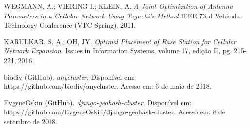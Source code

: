 \documentclass[]{politex}
\begin{document}
\begin{thebibliography}{9}
    WEGMANN, A.; VIERING I.; KLEIN, A.
    \textit{A Joint Optimization of Antenna Parameters in a
    Cellular Network Using Taguchi’s Method}
    IEEE 73rd Vehicular Technology Conference (VTC Spring), 2011.

    KARULKAR, S. A.; OH, JY.
    \textit{Optimal Placement of Base Station for Cellular Network Expansion}.
    Issues in Information Systems, volume 17, edição II, pg. 215-221, 2016.

    biodiv (GitHub).
    \textit{anycluster}.
    Disponível em: https://github.com/biodiv/anycluster.
    Acesso em: 6 de maio de 2018.

    EvgeneOskin (GitHub).
    \textit{django-geohash-cluster}.
    Disponível em: https://github.com/EvgeneOskin/django-geohash-cluster.
    Acesso em: 8 de setembro de 2018.

\end{thebibliography}
\apendice


\anexo
\end{document}
